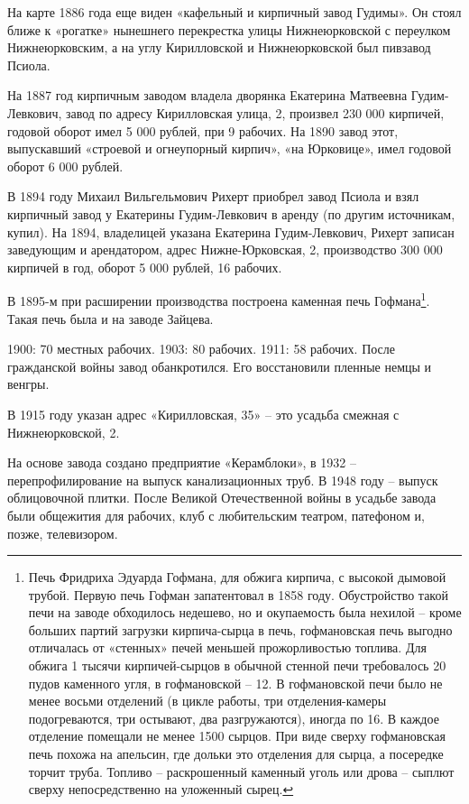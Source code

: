 На карте 1886 года еще виден «кафельный и кирпичный завод Гудимы». Он стоял ближе к «рогатке» нынешнего перекрестка улицы Нижнеюрковской с переулком Нижнеюрковским, а на углу Кирилловской и Нижнеюрковской был пивзавод Псиола.

На 1887 год кирпичным заводом владела дворянка Екатерина Матвеевна Гудим-Левкович, завод по адресу Кирилловская улица, 2, произвел 230 000 кирпичей, годовой оборот имел 5 000 рублей, при 9 рабочих. На 1890 завод этот, выпускавший «строевой и огнеупорный кирпич», «на Юрковице», имел годовой оборот 6 000 рублей.

В 1894 году Михаил Вильгельмович Рихерт приобрел завод Псиола и взял кирпичный завод у Екатерины Гудим-Левкович в аренду (по другим источникам, купил). На 1894, владелицей указана Екатерина Гудим-Левкович, Рихерт записан заведующим и арендатором, адрес Нижне-Юрковская, 2, производство 300 000 кирпичей в год, оборот 5 000 рублей, 16 рабочих.

В 1895-м при расширении производства построена каменная печь Гофмана\footnote{Печь Фридриха Эдуарда Гофмана, для обжига кирпича, с высокой дымовой трубой. Первую печь Гофман запатентовал в 1858 году. Обустройство такой печи на заводе обходилось недешево, но и окупаемость была нехилой – кроме больших партий загрузки кирпича-сырца в печь, гофмановская печь выгодно отличалась от «стенных» печей меньшей прожорливостью топлива. Для обжига 1 тысячи кирпичей-сырцов в обычной стенной печи требовалось 20 пудов каменного угля, в гофмановской – 12. В гофмановской печи было не менее восьми отделений (в цикле работы, три отделения-камеры подогреваются, три остывают, два разгружаются), иногда по 16. В каждое отделение помещали не менее 1500 сырцов. При виде сверху гофмановская печь похожа на апельсин, где дольки это отделения для сырца, а посередке торчит труба. Топливо – раскрошенный каменный уголь или дрова –  сыплют сверху непосредственно на уложенный сырец.}. Такая печь была и на заводе Зайцева.

1900: 70 местных рабочих. 1903: 80 рабочих. 1911: 58 рабочих. После гражданской войны завод обанкротился. Его восстановили пленные немцы и венгры. 

В 1915 году указан адрес «Кирилловская, 35» – это усадьба смежная с Нижнеюрковской, 2.

На основе завода создано предприятие «Керамблоки», в 1932 – перепрофилирование на выпуск канализационных труб. В 1948 году – выпуск облицовочной плитки. После Великой Отечественной войны в усадьбе завода были общежития для рабочих, клуб с любительским театром, патефоном и, позже, телевизором. 

